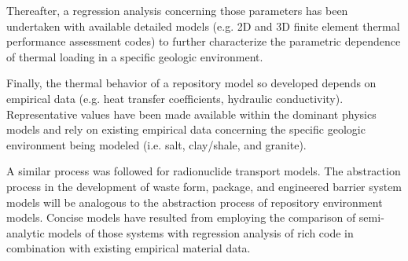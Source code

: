 
%

Thereafter, a regression analysis concerning those parameters has been undertaken 
with available detailed models (e.g. 2D and 3D finite element thermal 
performance assessment codes) to further characterize the 
parametric dependence of thermal loading in a specific geologic environment.  


Finally, the thermal behavior of a repository model so developed depends on 
empirical data (e.g.  heat transfer coefficients, hydraulic conductivity).  
Representative values have been made available within the dominant 
physics models and rely on existing empirical data concerning the specific 
geologic environment being modeled (i.e. salt, clay/shale, and granite). 


A similar process was followed for radionuclide transport models.  The 
abstraction process in the development of waste form, package, and engineered 
barrier system models will be analogous to the abstraction process of repository 
environment models. Concise models have resulted from employing the comparison of 
semi-analytic models of those systems with regression analysis of rich code in 
combination with existing empirical material data.



